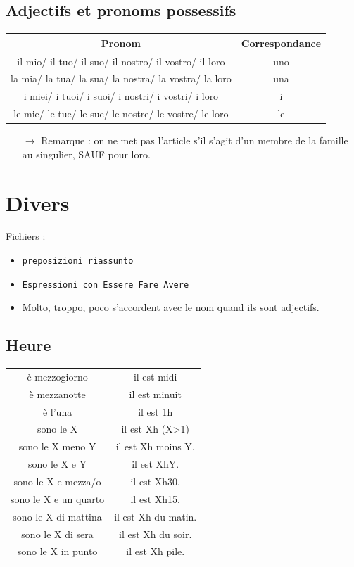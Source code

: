 \documentclass[12pt, openany]{report}
\begin{document}
\section{Adjectifs et pronoms possessifs}
\begin{center}
    \begin{tabular}{c|c}
        Pronom & Correspondance\\ \hline
        il mio/ il tuo/ il suo/ il nostro/ il vostro/ il loro & uno \\
        la mia/ la tua/ la sua/ la nostra/ la vostra/ la loro & una\\
        i miei/ i tuoi/ i suoi/ i nostri/ i vostri/ i loro & i\\
        le mie/ le tue/ le sue/ le nostre/ le vostre/ le loro & le\\
    \end{tabular}
\end{center}
\begin{itemize}
    \item [$\rightarrow$] Remarque : on ne met pas l'article s'il s'agit d'un membre de la famille au singulier, SAUF pour loro. 
\end{itemize}
\chapter{Divers}
\underline{Fichiers :}
\begin{itemize}
    \item \texttt{preposizioni riassunto}
    \item \texttt{Espressioni con Essere Fare Avere}
    \item Molto, troppo, poco s'accordent avec le nom quand ils sont adjectifs. 
\end{itemize}
\section{Heure}
\begin{center}
    \begin{tabular}{c|c}
        è mezzogiorno  & il est midi\\
        è mezzanotte & il est minuit\\
        è l'una & il est 1h\\
        sono le X & il est Xh (X>1)\\
        sono le X meno Y & il est Xh moins Y.\\
        sono le X e Y & il est XhY.\\
        sono le X e mezza/o & il est Xh30.\\
        sono le X e un quarto & il est Xh15.\\
        sono le X di mattina & il est Xh du matin.\\
        sono le X di sera & il est Xh du soir.\\
        sono le X in punto & il est Xh pile.\\
    \end{tabular}
\end{center}
\end{document}
